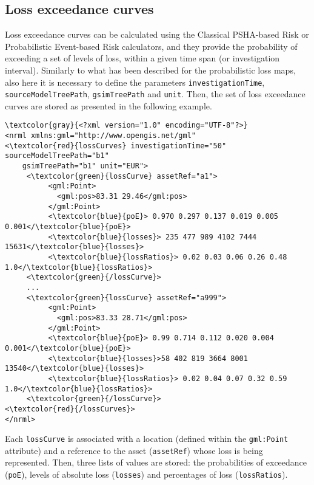 \subsection{Loss exceedance curves}
Loss exceedance curves can be calculated using the Classical PSHA-based Risk or Probabilistic Event-based Risk calculators, and they provide the probability of exceeding a set of levels of loss, within a given time span (or investigation interval). Similarly to what has been described for the probabilistic loss maps, also here it is necessary to define the parameters \Verb+investigationTime+, \Verb+sourceModelTreePath+, \Verb+gsimTreePath+ and \Verb+unit+. Then, the set of loss exceedance curves are stored as presented in the following example.

\begin{Verbatim}[frame=single, commandchars=\\\{\}, samepage=false]
\textcolor{gray}{<?xml version="1.0" encoding="UTF-8"?>}
<nrml xmlns:gml="http://www.opengis.net/gml"
<\textcolor{red}{lossCurves} investigationTime="50" sourceModelTreePath="b1"
    gsimTreePath="b1" unit="EUR">
     <\textcolor{green}{lossCurve} assetRef="a1">
          <gml:Point>
            <gml:pos>83.31 29.46</gml:pos>
          </gml:Point>
          <\textcolor{blue}{poE}> 0.970 0.297 0.137 0.019 0.005 0.001</\textcolor{blue}{poE}>
          <\textcolor{blue}{losses}> 235 477 989 4102 7444 15631</\textcolor{blue}{losses}>
          <\textcolor{blue}{lossRatios}> 0.02 0.03 0.06 0.26 0.48 1.0</\textcolor{blue}{lossRatios}>
     <\textcolor{green}{/lossCurve}>
     ...
     <\textcolor{green}{lossCurve} assetRef="a999">
          <gml:Point>
            <gml:pos>83.33 28.71</gml:pos>
          </gml:Point>
          <\textcolor{blue}{poE}> 0.99 0.714 0.112 0.020 0.004 0.001</\textcolor{blue}{poE}>
          <\textcolor{blue}{losses}>58 402 819 3664 8001 13540</\textcolor{blue}{losses}>
          <\textcolor{blue}{lossRatios}> 0.02 0.04 0.07 0.32 0.59 1.0</\textcolor{blue}{lossRatios}>
     <\textcolor{green}{/lossCurve}>
<\textcolor{red}{/lossCurves}>
</nrml>
\end{Verbatim}

Each \Verb+lossCurve+ is associated with a location (defined within the \Verb+gml:Point+ attribute) and a reference to the \gls{asset} (\Verb+assetRef+) whose loss is being represented. Then, three lists of values are stored: the probabilities of exceedance (\Verb+poE+), levels of absolute loss (\Verb+losses+) and percentages of loss (\Verb+lossRatios+).

